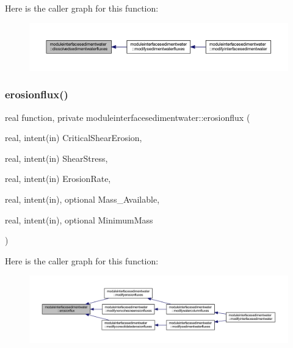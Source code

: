 Here is the caller graph for this function\+:\nopagebreak
\begin{figure}[H]
\begin{center}
\leavevmode
\includegraphics[width=350pt]{namespacemoduleinterfacesedimentwater_a892fef59c88570196d680f581deef4a9_icgraph}
\end{center}
\end{figure}
\mbox{\label{namespacemoduleinterfacesedimentwater_a564b97311dc02a020ceaabdd4192ae46}} 
\subsubsection{\texorpdfstring{erosionflux()}{erosionflux()}}
{\footnotesize\ttfamily real function, private moduleinterfacesedimentwater\+::erosionflux (\begin{DoxyParamCaption}\item[{real, intent(in)}]{Critical\+Shear\+Erosion,  }\item[{real, intent(in)}]{Shear\+Stress,  }\item[{real, intent(in)}]{Erosion\+Rate,  }\item[{real, intent(in), optional}]{Mass\+\_\+\+Available,  }\item[{real, intent(in), optional}]{Minimum\+Mass }\end{DoxyParamCaption})\hspace{0.3cm}{\ttfamily [private]}}

Here is the caller graph for this function\+:\nopagebreak
\begin{figure}[H]
\begin{center}
\leavevmode
\includegraphics[width=350pt]{namespacemoduleinterfacesedimentwater_a564b97311dc02a020ceaabdd4192ae46_icgraph}
\end{center}
\end{figure}
\mbox{\label{namespacemoduleinterfacesedimentwater_a3daecfd36630da785ff12a9ea8c61064}} 
